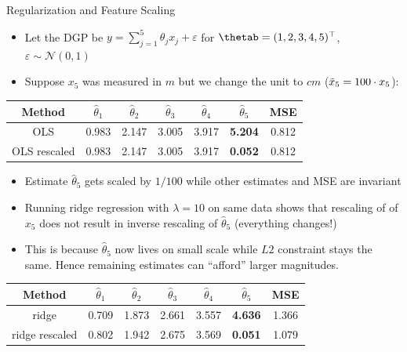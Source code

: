 \documentclass[11pt,compress,t,notes=noshow, xcolor=table]{beamer}
\begin{document}
\begin{vbframe}{Regularization and Feature Scaling}
\footnotesize{
\begin{itemize}
    \item Let the DGP be $y = \sum_{j=1}^{5} \theta_j x_{j} +\varepsilon$ for $\thetab=(1,2,3,4,5)^\top$, $\varepsilon \sim \mathcal{N}(0,1)$ %
    \item Suppose $x_5$ was measured in $m$ but we change the unit to $cm$ ($\Tilde{x}_5=100 \cdot x_5$):
\end{itemize}
\vspace{-0.4cm}
\begin{table}[h]
\centering
\begin{tabular}{|c|c c c c c c|}
\hline
\textbf{Method} & \( \hat{\theta}_1 \) & \( \hat{\theta}_2 \) & \( \hat{\theta}_3 \) & \( \hat{\theta}_4 \) & \( \hat{\theta}_5 \) & MSE \\ \hline
OLS             & 0.983 & 2.147 & 3.005 & 3.917 & \textbf{5.204} & 0.812 \\ %
OLS rescaled    & 0.983 & 2.147 & 3.005 & 3.917 & \textbf{0.052} & 0.812 \\ \hline
\end{tabular}
\end{table}
\vspace{-0.1cm}
\begin{itemize}
    \item Estimate $\hat{\theta}_5$ gets scaled by $1/100$ while other estimates and MSE are invariant
    \item Running ridge regression with $\lambda=10$ on same data shows that rescaling of of $x_5$ does not result in inverse rescaling of $\hat{\theta}_5$ (everything changes!)
    \item This is because $\hat{\theta}_5$ now lives on small scale while $L2$ constraint stays the same. Hence remaining estimates can ``afford'' larger magnitudes.
\end{itemize}
\vspace{-0.4cm}
\begin{table}[h]
\centering
\begin{tabular}{|c|c c c c c c|}
\hline
\textbf{Method} & \( \hat{\theta}_1 \) & \( \hat{\theta}_2 \) & \( \hat{\theta}_3 \) & \( \hat{\theta}_4 \) & \( \hat{\theta}_5 \) & MSE \\ \hline
ridge           & 0.709 & 1.873 & 2.661 & 3.557 & \textbf{4.636} & 1.366 \\ %
ridge rescaled  & 0.802 & 1.942 & 2.675 & 3.569 & \textbf{0.051} & 1.079 \\ \hline
\end{tabular}
\end{table}
}


\end{vbframe}
\end{document}
